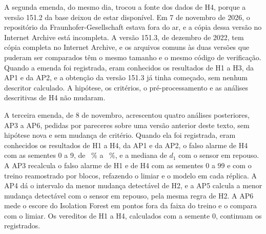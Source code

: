 A segunda emenda, do mesmo dia, trocou a fonte dos dados de H4, porque a versão 151.2 da base deixou de estar disponível. Em 7 de novembro de 2026, o repositório da Fraunhofer-Gesellschaft estava fora do ar, e a cópia dessa versão no Internet Archive está incompleta. A versão 151.3, de dezembro de 2022, tem cópia completa no Internet Archive, e os arquivos comuns às duas versões que puderam ser comparados têm o mesmo tamanho e o mesmo código de verificação. Quando a emenda foi registrada, eram conhecidos os resultados de H1 a H3, da AP1 e da AP2, e a obtenção da versão 151.3 já tinha começado, sem nenhum descritor calculado. A hipótese, os critérios, o pré-processamento e as análises descritivas de H4 não mudaram.

A terceira emenda, de 8 de novembro, acrescentou quatro análises posteriores, AP3 a AP6, pedidas por pareceres sobre uma versão anterior deste texto, sem hipótese nova e sem mudança de critério. Quando ela foi registrada, eram conhecidos os resultados de H1 a H4, da AP1 e da AP2, o falso alarme de H4 com as sementes 0 a 9, de \hQuatroFaSementeMin~\% a \hQuatroFaSementeMax~\%, e a mediana de $d_1$ com o sensor em repouso. A AP3 recalcula o falso alarme de H1 e de H4 com as sementes 0 a 99 e com o treino reamostrado por blocos, refazendo o limiar e o modelo em cada réplica. A AP4 dá o intervalo da menor mudança detectável de H2, e a AP5 calcula a menor mudança detectável com o sensor em repouso, pela mesma regra de H2. A AP6 mede o escore do Isolation Forest em pontos fora da faixa do treino e o compara com o limiar. Os vereditos de H1 a H4, calculados com a semente 0, continuam os registrados.
